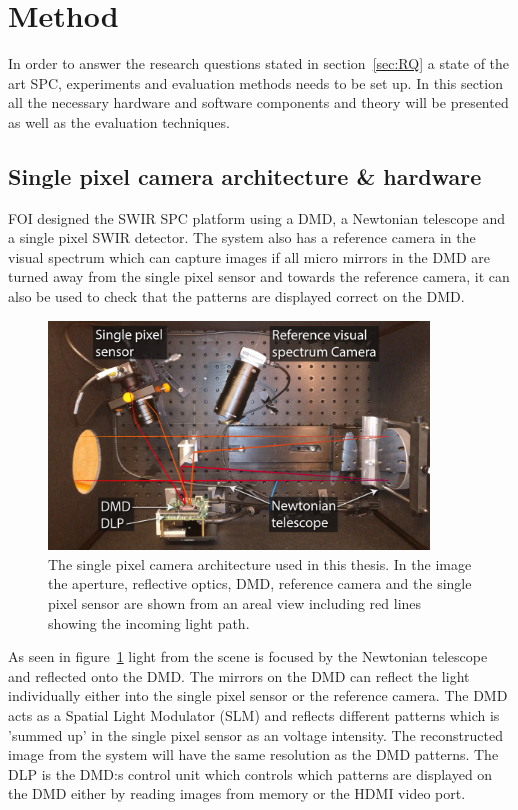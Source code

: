 \section{Method}
\label{sec:method}
In order to answer the research questions stated in section~\ref{sec:RQ} a state of the art SPC, experiments and evaluation methods needs to be set up. In this section all the necessary hardware and software components and theory will be presented as well as the evaluation techniques. 


\subsection{Single pixel camera architecture \& hardware}
\label{sec:system}
FOI designed the SWIR SPC platform using a DMD, a Newtonian telescope and a single pixel SWIR detector. The system also has a reference camera in the visual spectrum  which can capture images if all micro mirrors in the DMD are turned away from the single pixel sensor and towards the reference camera, it can also be used to check that the patterns are displayed correct on the DMD.  

\begin{figure}[H]
    \centering
    \includegraphics[width = 0.9\textwidth]{gfx/SPC.png}
    \caption{The single pixel camera architecture used in this thesis. In the image the aperture, reflective optics, DMD, reference camera and the single pixel sensor are shown from an areal view including red lines showing the incoming light path.}
    \label{fig:system1}
\end{figure}



As seen in figure~\ref{fig:system1} light from the scene is focused by the Newtonian telescope and reflected onto the DMD. The mirrors on the DMD can reflect the light individually either into the single pixel sensor or the reference camera. The DMD acts as a Spatial Light Modulator (SLM) and reflects different patterns which is 'summed up' in the single pixel sensor as an voltage intensity. The reconstructed image from the system will have the same resolution as the DMD patterns. The DLP is the DMD:s control unit which controls which patterns are displayed on the DMD either by reading images from memory or the HDMI video port. 

